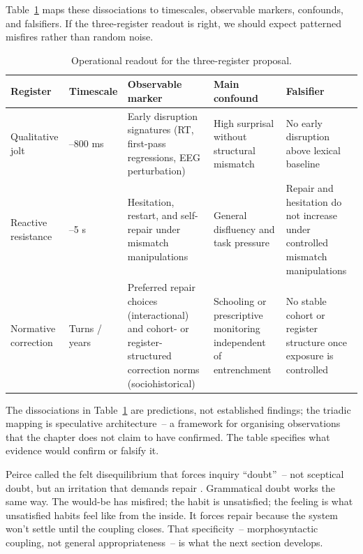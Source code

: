 Table~\ref{tab:15:three-register-operational} maps these dissociations to timescales, observable markers, confounds, and falsifiers. If the three-register readout is right, we should expect patterned misfires rather than random noise.

\begin{table}[h]
\centering
\small
\begin{tabular}{@{}>{\raggedright\arraybackslash}p{}>{\raggedright\arraybackslash}p{}>{\raggedright\arraybackslash}p{}>{\raggedright\arraybackslash}p{}>{\raggedright\arraybackslash}p{}@{}}
\toprule
\textbf{Register} & \textbf{Timescale} & \textbf{Observable marker} & \textbf{Main confound} & \textbf{Falsifier} \\
\midrule
Qualitative jolt & 100--800 ms & Early disruption signatures (RT, first-pass regressions, EEG perturbation) & High surprisal without structural mismatch & No early disruption above lexical baseline \\
Reactive resistance & 0.5--5 s & Hesitation, restart, and self-repair under mismatch manipulations & General disfluency and task pressure & Repair and hesitation do not increase under controlled mismatch manipulations \\
Normative correction & Turns / years & Preferred repair choices (interactional) and cohort- or register-structured correction norms (sociohistorical) & Schooling or prescriptive monitoring independent of entrenchment & No stable cohort or register structure once exposure is controlled \\
\bottomrule
\end{tabular}
\caption{Operational readout for the three-register proposal.}
\label{tab:15:three-register-operational}
\end{table}

The dissociations in Table~\ref{tab:15:three-register-operational} are predictions, not established findings; the triadic mapping is speculative architecture~-- a framework for organising observations that the chapter does not claim to have confirmed. The table specifies what evidence would confirm or falsify it.

Peirce called the felt disequilibrium that forces inquiry \enquote{doubt}~-- not sceptical doubt, but an irritation that demands repair \citep[CP~5.374]{peirce1931cp}. Grammatical doubt works the same way. The would-be has misfired; the habit is unsatisfied; the feeling is what unsatisfied habits feel like from the inside. It forces repair because the system won't settle until the coupling closes. That specificity~-- morphosyntactic coupling, not general appropriateness~-- is what the next section develops.


